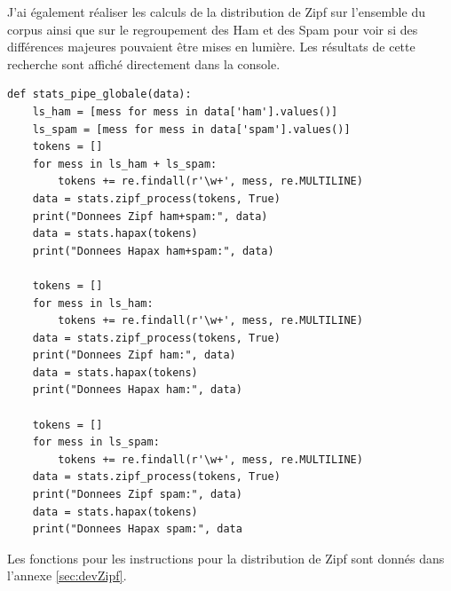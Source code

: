 \documentclass[a4paper,12pt]{article}
\begin{document}
	J'ai également réaliser les calculs de la distribution de Zipf sur l'ensemble du corpus ainsi que sur le regroupement des Ham et des Spam pour voir si des différences majeures pouvaient être mises en lumière. Les résultats de cette recherche sont affiché directement dans la console.
		
	\begin{lstlisting}[title=Pipeline pour les données globales]
def stats_pipe_globale(data):
    ls_ham = [mess for mess in data['ham'].values()]
    ls_spam = [mess for mess in data['spam'].values()]
    tokens = []
    for mess in ls_ham + ls_spam:
        tokens += re.findall(r'\w+', mess, re.MULTILINE)
    data = stats.zipf_process(tokens, True)
    print("Donnees Zipf ham+spam:", data)
    data = stats.hapax(tokens)
    print("Donnees Hapax ham+spam:", data)

    tokens = []
    for mess in ls_ham:
        tokens += re.findall(r'\w+', mess, re.MULTILINE)
    data = stats.zipf_process(tokens, True)
    print("Donnees Zipf ham:", data)
    data = stats.hapax(tokens)
    print("Donnees Hapax ham:", data)

    tokens = []
    for mess in ls_spam:
        tokens += re.findall(r'\w+', mess, re.MULTILINE)
    data = stats.zipf_process(tokens, True)
    print("Donnees Zipf spam:", data)
    data = stats.hapax(tokens)
    print("Donnees Hapax spam:", data
	\end{lstlisting}
	
	Les fonctions pour les instructions pour la distribution de Zipf sont donnés dans l'annexe \ref{sec:devZipf}.
	
\end{document}
